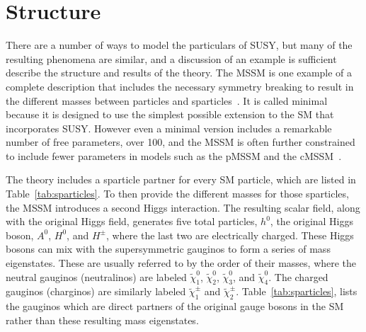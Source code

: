 
\section{Structure}
\label{sec:mssm}

There are a number of ways to model the particulars of \ac{SUSY}, but many of the resulting phenomena are similar, and a discussion of an example is sufficient describe the structure and results of the theory.
The \ac{MSSM} is one example of a complete description that includes the necessary symmetry breaking to result in the different masses between particles and sparticles~\cite{mssm}.
It is called minimal because it is designed to use the simplest possible extension to the \ac{SM} that incorporates \ac{SUSY}.
However even a minimal version includes a remarkable number of free parameters, over 100, and the \ac{MSSM} is often further constrained to include fewer parameters in models such as the \ac{pMSSM} and the \ac{cMSSM}~\cite{pmssm}.

The theory includes a sparticle partner for every \ac{SM} particle, which are listed in Table~\ref{tab:sparticles}.
To then provide the different masses for those sparticles, the \ac{MSSM} introduces a second Higgs interaction.
The resulting scalar field, along with the original Higgs field, generates five total particles, $h^0$, the original Higgs boson, $A^0$, $H^0$, and $H^\pm$, where the last two are electrically charged.
These Higgs bosons can mix with the supersymmetric gauginos to form a series of mass eigenstates.
These are usually referred to by the order of their masses, where the neutral gauginos (neutralinos) are labeled $\tilde{\chi}_1^0$, $\tilde{\chi}_2^0$, $\tilde{\chi}_3^0$, and $\tilde{\chi}_4^0$. 
The charged gauginos (charginos) are similarly labeled $\tilde{\chi}_1^\pm$ and $\tilde{\chi}_2^\pm$. 
Table~\ref{tab:sparticles}, lists the gauginos which are direct partners of the original gauge bosons in the \ac{SM} rather than these resulting mass eigenstates.


